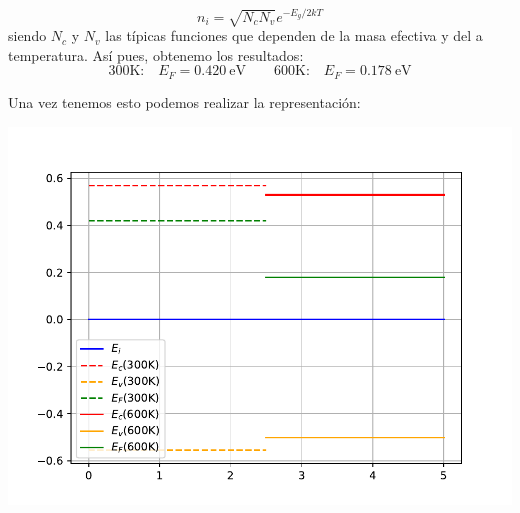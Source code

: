 \begin{texercise}
\begin{itemize}
		      \begin{equation}
			      n_i = \sqrt{N_c N_v} e^{-E_g/2kT}
		      \end{equation}
		      siendo $N_c$ y $N_v$ las típicas funciones que dependen de la masa efectiva y del a temperatura. Así pues, obtenemo los resultados:
		      \begin{equation}
			      \text{300K:}\quad
			      E_F = 0.420 \ \text{eV} \qquad
			      \text{600K:}\quad
			      E_F= 0.178 \ \text{eV}
		      \end{equation}
	\end{itemize}
	Una vez tenemos esto podemos realizar la representación:
	\begin{center}
		\includegraphics[width=0.9\linewidth]{Cuerpo/Ch_01/Ejercicio_01_7.pdf}
	\end{center}
\end{texercise}



